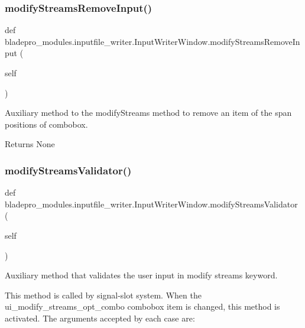 \subsubsection{\texorpdfstring{modify\+Streams\+Remove\+Input()}{modifyStreamsRemoveInput()}}
{\footnotesize\ttfamily def bladepro\+\_\+modules.\+inputfile\+\_\+writer.\+Input\+Writer\+Window.\+modify\+Streams\+Remove\+Input (\begin{DoxyParamCaption}\item[{}]{self }\end{DoxyParamCaption})}



Auxiliary method to the modify\+Streams method to remove an item of the span positions of combobox. 

\begin{DoxyReturn}{Returns}
None 
\end{DoxyReturn}
\hypertarget{classbladepro__modules_1_1inputfile__writer_1_1_input_writer_window_af60dda179dc289691a59b52cb8ed3e70}{}\label{classbladepro__modules_1_1inputfile__writer_1_1_input_writer_window_af60dda179dc289691a59b52cb8ed3e70} 
\subsubsection{\texorpdfstring{modify\+Streams\+Validator()}{modifyStreamsValidator()}}
{\footnotesize\ttfamily def bladepro\+\_\+modules.\+inputfile\+\_\+writer.\+Input\+Writer\+Window.\+modify\+Streams\+Validator (\begin{DoxyParamCaption}\item[{}]{self }\end{DoxyParamCaption})}



Auxiliary method that validates the user input in modify streams keyword. 

This method is called by signal-\/slot system. When the ui\+\_\+modify\+\_\+streams\+\_\+opt\+\_\+combo combobox item is changed, this method is activated. The arguments accepted by each case are\+:

